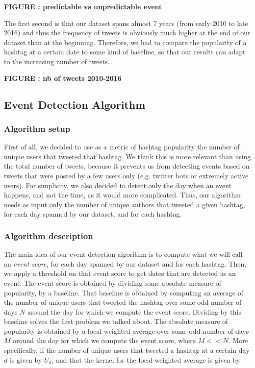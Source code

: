 \documentclass[11pt]{article}
\begin{document}
\textbf{FIGURE : predictable vs unpredictable event}

The first second is that our dataset spans almost 7 years (from early 2010 to late 2016) and thus the frequency of tweets is obviously much higher at the end of our dataset than at the beginning. Therefore, we had to compare the popularity of a hashtag at a certain date to some kind of baseline, so that our results can adapt to the increasing number of tweets.

\textbf{FIGURE : nb of tweets 2010-2016}

\subsection{Event Detection Algorithm}
\subsubsection{Algorithm setup}
First of all, we decided to use as a metric of hashtag popularity the number of unique users that tweeted that hashtag. We think this is more relevant than using the total number of tweets, because it prevents us from detecting events based on tweets that were posted by a few users only (e.g. twitter bots or extremely active users). For simplicity, we also decided to detect only the day when an event happens, and not the time, as it would more complicated. Thus, our algorithm needs as input only the number of unique authors that tweeted a given hashtag, for each day spanned by our dataset, and for each hashtag.

\subsubsection{Algorithm description}
The main idea of our event detection algorithm is to compute what we will call an \textit{event score}, for each day spanned by our dataset and for each hashtag. Then, we apply a threshold on that event score to get dates that are detected as an event.
The event score is obtained by dividing some absolute measure of popularity, by a baseline. That baseline is obtained by computing an average of the number of unique users that tweeted the hashtag over some odd number of days $N$ around the day for which we compute the event score. Dividing by this baseline solves the first problem we talked about. The absolute measure of popularity is obtained by a local weighted average over some odd number of days $M$ around the day for which we compute the event score, where $M << N$. 
More specifically, if the number of unique users that tweeted a hashtag at a certain day $d$ is given by $U_d$, and that the kernel for the local weighted average is given by 
\end{document}
